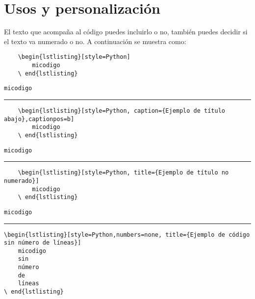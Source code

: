 \section{Usos y personalización}
\label{usos}

El texto que acompaña al código puedes incluirlo o no, también puedes decidir si el texto va numerado o no. A continuación se muestra como:
\begin{lstlisting}[style=Latex-color]
	% Con esta línea el código no tendrá título
	\begin{lstlisting}[style=Python]
		micodigo
	\ end{lstlisting}
\end{lstlisting}

\begin{lstlisting}[style=Python]
	micodigo
\end{lstlisting}
\vspace{1em}
\noindent\hrule
\vspace{1em}
\begin{lstlisting}[style=Latex-color]
	% Con esta línea el código tendrá el título abajo
	\begin{lstlisting}[style=Python, caption={Ejemplo de título abajo},captionpos=b]
		micodigo
	\ end{lstlisting}
\end{lstlisting}

\begin{lstlisting}[style=Python,caption={Ejemplo de título abajo},captionpos=b]
	micodigo
\end{lstlisting}
\vspace{1em}
\noindent\hrule
\vspace{1em}
\begin{lstlisting}[style=Latex-color]
	% Con esta línea el código tendrá título no numerado
	\begin{lstlisting}[style=Python, title={Ejemplo de título no numerado}]
		micodigo
	\ end{lstlisting}
\end{lstlisting}

\begin{lstlisting}[style=Python,title={Ejemplo de título no numerado}]
	micodigo
\end{lstlisting}
\vspace{1em}
\noindent\hrule
\vspace{1em}
\begin{lstlisting}[style=Latex-color]
	% Con esta línea el código no tendrá las líneas numeradas
\begin{lstlisting}[style=Python,numbers=none, title={Ejemplo de código sin número de líneas}]
	micodigo
	sin
	número
	de
	líneas
\ end{lstlisting}
\end{lstlisting}


